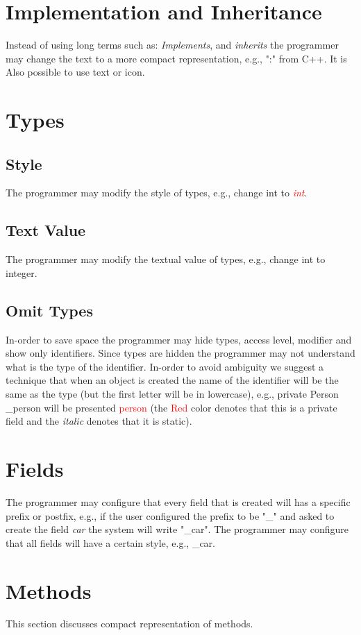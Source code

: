 \section{Implementation and Inheritance}
Instead of using long terms such as: \textit{Implements}, and \textit{inherits} the programmer may change the text to a more compact representation, e.g., ":" from C++. It is Also possible to use text or icon.
\section{Types}
\subsection{Style}
The programmer may modify the style of types, e.g., change int to \textit{\textcolor{red}{int}}.
\subsection{Text Value}
The programmer may modify the textual value of types, e.g., change int to integer.
\subsection{Omit Types}
In-order to save space the programmer may hide types, access level, modifier and show only identifiers. Since types are hidden the programmer may not understand what is the type of the identifier. In-order to avoid ambiguity we suggest a technique that when an object is created the name of the identifier will be the same as the type (but the first letter will be in lowercase), e.g., private Person \_person will be presented \textcolor{red}{person} (the \textcolor{red}{Red} color denotes that this is a private field and the \textit{italic} denotes that it is static).
\section{Fields}
The programmer may configure that every field that is created will has a specific prefix or postfix, e.g., if the user configured the prefix to be "\_" and asked to create the field \textit{car} the system will write "\_car". The programmer may configure that all fields will have a certain style, e.g., \_car.
\section{Methods}
This section discusses compact representation of methods.
